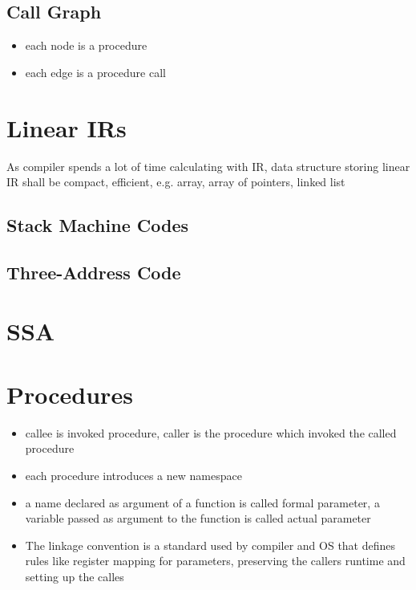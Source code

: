 \subsection{Call Graph}
\begin{itemize}
    \item each node is a procedure
    \item each edge is a procedure call
\end{itemize}

\section{Linear IRs}
As compiler spends a lot of time calculating with IR, data structure storing linear IR shall be compact, efficient, e.g. array, array of pointers, linked list 

\subsection{Stack Machine Codes}

\subsection{Three-Address Code}

\section{SSA}

\section{Procedures}
\begin{itemize}
    \item callee is invoked procedure, caller is the procedure which invoked the called procedure
    \item each procedure introduces a new namespace
    \item a name declared as argument of a function is called formal parameter, a variable passed as argument to the function is called actual parameter
    \item The linkage convention is a standard used by compiler and OS that defines rules like register mapping for parameters, preserving the callers runtime and setting up the calles
\end{itemize}
